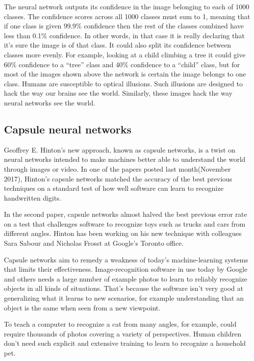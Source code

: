 \documentclass[12pt]{article}
\begin{document}
 The neural network outputs its confidence in the image belonging to each of 1000 classes. The confidence scores across all 1000 classes must sum to 1, meaning that if one class is given 99.9\% confidence then the rest of the classes combined have less than 0.1\% confidence. In other words, in that case it is really declaring that it’s sure the image is of that class. It could also split its confidence between classes more evenly. For example, looking at a child climbing a tree it could give 60\% confidence to a “tree” class and 40\% confidence to a “child” class, but for most of the images shown above the network is certain the image belongs to one class. Humans are susceptible to optical illusions. Such illusions are designed to hack the way our brains see the world. Similarly, these images hack the way neural networks see the world. 
\subsection{Capsule neural networks}

Geoffrey E. Hinton’s new approach, known as capsule networks, is a twist on neural networks intended to make machines better able to understand the world through images or video. In one of the papers posted last month(November 2017), Hinton’s capsule networks matched the accuracy of the best previous techniques on a standard test of how well software can learn to recognize handwritten digits.

In the second paper, capsule networks almost halved the best previous error rate on a test that challenges software to recognize toys such as trucks and cars from different angles. Hinton has been working on his new technique with colleagues Sara Sabour and Nicholas Frosst at Google’s Toronto office.

Capsule networks aim to remedy a weakness of today’s machine-learning systems that limits their effectiveness. Image-recognition software in use today by Google and others needs a large number of example photos to learn to reliably recognize objects in all kinds of situations. That’s because the software isn’t very good at generalizing what it learns to new scenarios, for example understanding that an object is the same when seen from a new viewpoint.

To teach a computer to recognize a cat from many angles, for example, could require thousands of photos covering a variety of perspectives. Human children don’t need such explicit and extensive training to learn to recognize a household pet.
\end{document}
